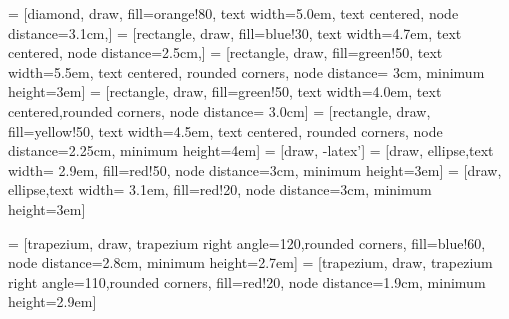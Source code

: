 \documentclass[conference]{IEEEtran}
\begin{document}
 = [diamond, draw, fill=orange!80,   
    text width=5.0em, text centered, node distance=3.1cm,]   
     = [rectangle, draw, fill=blue!30,   
    text width=4.7em, text centered, node distance=2.5cm,]   
    = [rectangle, draw, fill=green!50,  %
    text width=5.5em, text centered, rounded corners, node distance= 3cm, minimum height=3em] %
  = [rectangle, draw, fill=green!50,  
    text width=4.0em, text centered,rounded corners, node distance= 3.0cm]
 = [rectangle, draw, fill=yellow!50,   
    text width=4.5em, text centered, rounded corners, node distance=2.25cm, minimum height=4em]  
 = [draw, -latex']  
 = [draw, ellipse,text width= 2.9em, fill=red!50, node distance=3cm, minimum height=3em]  
 = [draw, ellipse,text width= 3.1em, fill=red!20, node distance=3cm, minimum height=3em]  
  
 = [trapezium, draw, trapezium right angle=120,rounded corners, fill=blue!60, node distance=2.8cm, minimum height=2.7em]  
  = [trapezium, draw, trapezium right angle=110,rounded corners, fill=red!20, node distance=1.9cm, minimum height=2.9em]   %
\end{document}
